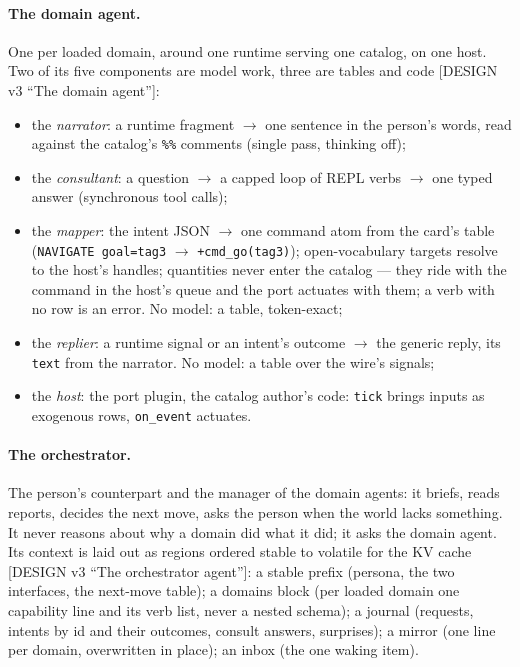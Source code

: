 \documentclass[11pt]{article}
\newcommand{\src}[1]{{\footnotesize\textsf{[#1]}}}
\begin{document}
\paragraph{The domain agent.} One per loaded domain, around one runtime serving one
catalog, on one host. Two of its five components are model work, three are tables and
code \src{DESIGN v3 ``The domain agent''}:
\begin{itemize}[nosep]
\item the \emph{narrator}: a runtime fragment $\to$ one sentence in the person's words,
  read against the catalog's \texttt{\%\%} comments (single pass, thinking off);
\item the \emph{consultant}: a question $\to$ a capped loop of REPL verbs $\to$ one typed
  answer (synchronous tool calls);
\item the \emph{mapper}: the intent JSON $\to$ one command atom from the card's table
  (\texttt{NAVIGATE goal=tag3} $\to$ \texttt{+cmd\_go(tag3)}); open-vocabulary targets
  resolve to the host's handles; quantities never enter the catalog --- they ride with the
  command in the host's queue and the port actuates with them; a verb with no row is an
  error. No model: a table, token-exact;
\item the \emph{replier}: a runtime signal or an intent's outcome $\to$ the generic reply,
  its \texttt{text} from the narrator. No model: a table over the wire's signals;
\item the \emph{host}: the port plugin, the catalog author's code: \texttt{tick} brings
  inputs as exogenous rows, \texttt{on\_event} actuates.
\end{itemize}

\paragraph{The orchestrator.} The person's counterpart and the manager of the domain
agents: it briefs, reads reports, decides the next move, asks the person when the world
lacks something. It never reasons about why a domain did what it did; it asks the domain
agent. Its context is laid out as regions ordered stable to volatile for the KV cache
\src{DESIGN v3 ``The orchestrator agent''}: a stable prefix (persona, the two interfaces,
the next-move table); a domains block (per loaded domain one capability line and its verb
list, never a nested schema); a journal (requests, intents by id and their outcomes,
consult answers, surprises); a mirror (one line per domain, overwritten in place); an
inbox (the one waking item).
\end{document}
